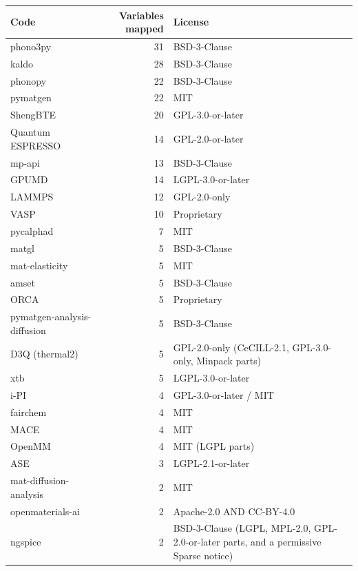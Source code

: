 \documentclass[11pt,a4paper]{article}
\begin{document}
\begin{center}
\begin{tabular}{lrl}
\toprule
Code & Variables mapped & License \\
\midrule
phono3py                     & 31 & BSD-3-Clause \\
kaldo                        & 28 & BSD-3-Clause \\
phonopy                      & 22 & BSD-3-Clause \\
pymatgen                     & 22 & MIT \\
ShengBTE                     & 20 & GPL-3.0-or-later \\
Quantum ESPRESSO             & 14 & GPL-2.0-or-later \\
mp-api                       & 13 & BSD-3-Clause \\
GPUMD                        & 14 & LGPL-3.0-or-later \\
LAMMPS                       & 12 & GPL-2.0-only \\
VASP                         & 10 & Proprietary \\
pycalphad                    & 7  & MIT \\
matgl                        & 5  & BSD-3-Clause \\
mat-elasticity               & 5  & MIT \\
amset                        & 5  & BSD-3-Clause \\
ORCA                         & 5  & Proprietary \\
pymatgen-analysis-diffusion  & 5  & BSD-3-Clause \\
D3Q (thermal2)               & 5  & GPL-2.0-only (CeCILL-2.1, GPL-3.0-only, Minpack parts) \\
xtb                          & 5  & LGPL-3.0-or-later \\
i-PI                         & 4  & GPL-3.0-or-later / MIT \\
fairchem                     & 4  & MIT \\
MACE                         & 4  & MIT \\
OpenMM                       & 4  & MIT (LGPL parts) \\
ASE                          & 3  & LGPL-2.1-or-later \\
mat-diffusion-analysis       & 2  & MIT \\
openmaterials-ai             & 2  & Apache-2.0 AND CC-BY-4.0 \\
ngspice                      & 2  & BSD-3-Clause (LGPL, MPL-2.0, GPL-2.0-or-later parts, and a permissive Sparse notice) \\

\end{tabular}
\end{center}
\end{document}
